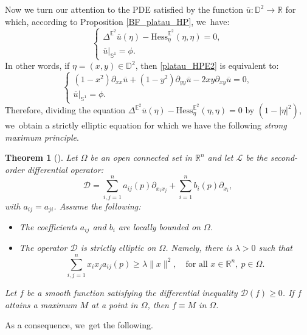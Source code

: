 \documentclass[11pt]{article}
\theoremstyle{plain}
\newtheorem{theorem}[cor]{Theorem}
\theoremstyle{definition}
\begin{document}
Now we turn our attention to the PDE satisfied by the function $\overline{u}:\mathbb{D}^2 \to \mathbb{R}$ for which, according to Proposition \ref{BF_platau_HP}, we~have:
\begin{equation}
\begin{cases}\label{platau_HPE2}
\Delta^{\mathbb{E}^2}\overline{u}(\eta) - \mathrm{Hess}_{\eta}^{\mathbb{E}^2}(\eta,\eta) = 0, \\
\overline{u}|_{\mathbb{S}^1} = \phi.
\end{cases}
\end{equation}
In other words, if $\eta = (x,y) \in \mathbb{D}^2$, then \eqref{platau_HPE2} is equivalent to:
\begin{equation}
\begin{cases}
(1-x^2)\partial_{xx}\overline{u} + (1-y^2)\partial_{yy}\overline{u} - 2xy\partial_{xy}\overline{u} = 0, \\
\overline{u}|_{\mathbb{S}^1} = \phi.
\end{cases}
\end{equation}
Therefore, dividing the equation $\Delta^{\mathbb{E}^2}\overline{u}(\eta) - \mathrm{Hess}_{\eta}^{\mathbb{E}^2}(\eta,\eta) = 0$ by $(1-\lvert\eta\rvert^2)$, we~obtain a strictly elliptic equation for which we have the following \emph{strong maximum principle}.

\begin{theorem}[{\cite[\S 3]{Protter1967MaximumPI}}]\label{Strong_Max_P}
Let $\Omega$ be an open connected set in $\mathbb{R}^n$ and let $\mathcal{L}$ be the second-order differential operator:
\[
\mathcal{D} = \sum_{i,j=1}^{n}a_{ij}(p)\partial_{x_ix_j} + \sum_{i=1}^nb_i(p)\partial_{x_i},
\]
with $a_{ij} = a_{ji}$. Assume the following:
\begin{itemize}
\item The coefficients $a_{ij}$ and $b_i$ are locally bounded on $\Omega$.
\item The operator $\mathcal{D}$ is \emph{strictly elliptic} on $\Omega$. Namely, there is $\lambda > 0$ such that
\[
\sum_{i,j=1}^{n} x_i x_j a_{ij}(p) \geq \lambda \lVert x \rVert^2, \quad \text{for all } x \in \mathbb{R}^n, \ p \in \Omega.
\]
\end{itemize}
Let $f$ be a smooth function satisfying the differential inequality $\mathcal{D}(f) \geq 0$. If $f$ attains a maximum $M$ at a point in $\Omega$, then $f \equiv M$ in $\Omega$.
\end{theorem}

As a consequence, we~get the following.
\end{document}
